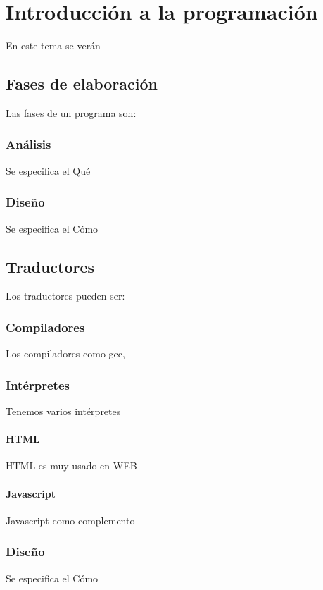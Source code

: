  \chapter{Introducción a la programación}
     En este tema se verán
     \section{Fases de elaboración}
        Las fases de un programa son:
        \subsection{Análisis}
           Se especifica el Qué
        \subsection{Diseño}
           Se especifica el Cómo     
     \section{Traductores}
        Los traductores pueden ser:
        \subsection{Compiladores}
          Los compiladores como gcc,
        \subsection{Intérpretes}
          Tenemos varios intérpretes
          \subsubsection{HTML}
            HTML es muy usado en WEB
          \subsubsection{Javascript}
            Javascript como complemento 
        \subsection{Diseño}
          Se especifica el Cómo     
     